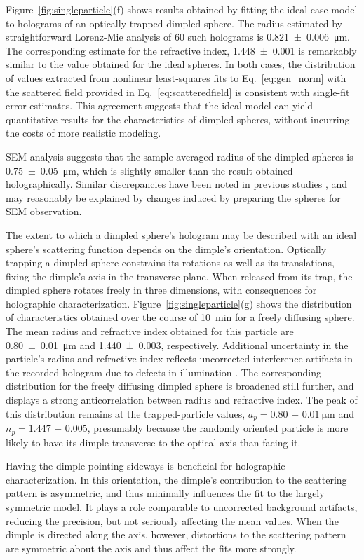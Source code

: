 Figure~\ref{fig:singleparticle}(f) shows results obtained by fitting the
ideal-case model to holograms of an optically trapped dimpled sphere.
The radius estimated by straightforward 
Lorenz-Mie analysis of \num{60} such holograms
is \SI{0.821(6)}{\um}.
The corresponding estimate for the refractive index,
\num{1.448(1)} is remarkably similar to the value obtained for the
ideal spheres.
In both cases, the distribution of
values extracted from nonlinear least-squares 
fits to Eq.~\eqref{eq:gen_norm} with the scattered field provided
in Eq.~\eqref{eq:scatteredfield} is consistent with single-fit error estimates.
This agreement suggests that the ideal model can yield quantitative
results for the characteristics of dimpled spheres, without incurring
the costs of more realistic modeling.

SEM analysis suggests that the sample-averaged radius of the
dimpled spheres is \SI{0.75(5)}{\um}, which is slightly smaller
than the result obtained holographically.
Similar discrepancies have been noted in previous studies
\cite{yamada85,cermola87},
and may reasonably be explained by changes
induced by preparing the spheres for SEM observation.

The extent to which a dimpled sphere's hologram may be described
with an ideal sphere's scattering function depends on the dimple's
orientation.
Optically trapping a dimpled sphere constrains its rotations 
as well as its translations, fixing the dimple's axis in the
transverse plane.
When released from its trap, the dimpled sphere rotates freely in three
dimensions, with consequences for holographic characterization.
Figure~\ref{fig:singleparticle}(g) shows the distribution of characteristics
obtained over the course of \SI{10}{\minute} for a freely diffusing
sphere.
The mean radius and refractive index obtained for this particle are
\SI{0.80(1)}{\um} and \num{1.440(3)}, respectively.
Additional uncertainty in the particle's radius and refractive index
reflects uncorrected interference artifacts in the recorded hologram due
to defects in illumination \cite{krishnatreya14}.
The corresponding distribution for the freely diffusing dimpled sphere
is broadened still further, and displays a strong anticorrelation between
radius and refractive index.
The peak of this distribution remains at the trapped-particle values,
$a_p = \SI{0.80(1)}{\um}$ and $n_p = \num{1.447(5)}$,
presumably because the randomly oriented particle is more likely 
to have its dimple transverse to the optical axis than facing it.

Having the dimple pointing sideways is beneficial for holographic
characterization.  In this orientation, the dimple's contribution to the 
scattering pattern is asymmetric, and thus minimally influences the
fit to the largely symmetric model.  It plays a role comparable to
uncorrected background artifacts, reducing the precision, but not
seriously affecting the mean values.
When the dimple is directed along the axis, however, distortions to
the scattering pattern are symmetric about the axis and thus affect
the fits more strongly.


